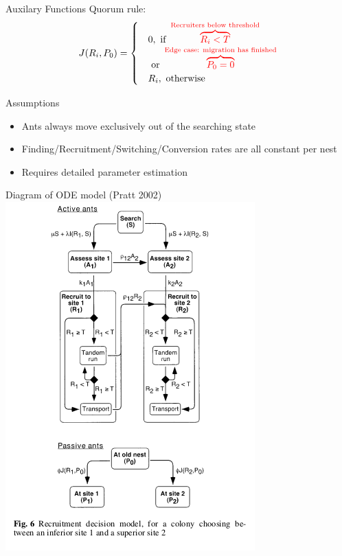 \documentclass{beamer}
\makeatletter
\def\mcolor#1#{\@mcolor{#1}}
\def\@mcolor#1#2#3{%
  \protect\leavevmode
  \begingroup
    \color#1{#2}#3%
  \endgroup
}
\newcommand{\annotate}[3]{
\mcolor{#1}{\overbrace{#3}^\text{#2}}
}
\makeatother
\begin{document}
  \begin{frame}{Auxilary Functions}
      \Large
      Quorum rule:
      \begin{equation}
          J(R_i, P_0) = 
          \begin{cases}
              & 0,  \text{ if } \annotate{red}{Recruiters below threshold}{R_i < T} \\  
              &     \text{     or } \annotate{red}{Edge case: migration has finished}{P_0 = 0}\\
              & R_i, \text{ otherwise}
          \end{cases}
      \end{equation}
  \end{frame}

  \begin{frame}{Assumptions}
      \begin{itemize}
          \item Ants always move exclusively out of the searching state
          \item Finding/Recruitment/Switching/Conversion rates are all constant per nest
          \item Requires detailed parameter estimation
      \end{itemize}
  \end{frame}

  \begin{frame}{Diagram of ODE model (Pratt 2002)}
      \includegraphics[scale=1.0]{diagram}
  \end{frame}
\end{document}
